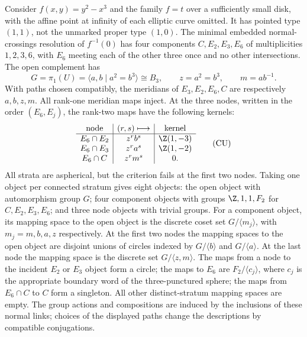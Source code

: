 \begin{example}\label{P1e-cusp}
Consider $f(x,y)=y^2-x^3$ and the family $f=t$ over a sufficiently small disk,
with the affine point at infinity of each elliptic curve omitted.  It has
pointed type $(1,1)$, not the unmarked proper type $(1,0)$.
The minimal embedded normal-crossings resolution of $f^{-1}(0)$ has four
components $C,E_2,E_3,E_6$ of multiplicities $1,2,3,6$, with $E_6$ meeting
each of the other three once and no other intersections.
The open complement has
\[
 G=\pi_1(U)=\langle a,b\mid a^2=b^3\rangle\cong B_3,\qquad
 z=a^2=b^3,\qquad m=ab^{-1}.
\]
With paths chosen compatibly, the meridians of $E_3,E_2,E_6,C$ are respectively
$a,b,z,m$.  All rank-one meridian maps inject.  At the three nodes, written
in the order $(E_6,E_j)$, the rank-two maps have the following kernels:
\[
 \begin{array}{c|c|c}
 \text{node}&(r,s)\longmapsto&\text{kernel}\\ \hline
 E_6\cap E_2&z^r b^s&\Z(1,-3)\\
 E_6\cap E_3&z^r a^s&\Z(1,-2)\\
 E_6\cap C&z^r m^s&0 .
 \end{array}                                                   \tag{CU}
\]
All strata are aspherical, but the criterion fails at the first two nodes.
Taking one object per connected stratum gives eight objects: the open object
with automorphism group $G$; four component objects with groups
$\Z,1,1,F_2$ for $C,E_2,E_3,E_6$; and three node objects with trivial groups.
For a component object, its mapping space to the open object is the discrete
coset set $G/\langle m_j\rangle$, with $m_j=m,b,a,z$ respectively.
At the first two nodes the mapping spaces to the open object are disjoint
unions of circles indexed by $G/\langle b\rangle$ and $G/\langle a\rangle$.
At the last node the mapping space is the discrete set
$G/\langle z,m\rangle$.
The maps from a node to the incident $E_2$ or $E_3$ object form a circle;
the maps to $E_6$ are $F_2/\langle c_j\rangle$, where $c_j$ is the appropriate
boundary word of the three-punctured sphere; the maps from $E_6\cap C$ to
$C$ form a singleton.  All other distinct-stratum mapping spaces are empty.
The group actions and compositions are induced by the inclusions of these
normal links; choices of the displayed paths change the descriptions by
compatible conjugations.
\end{example}

